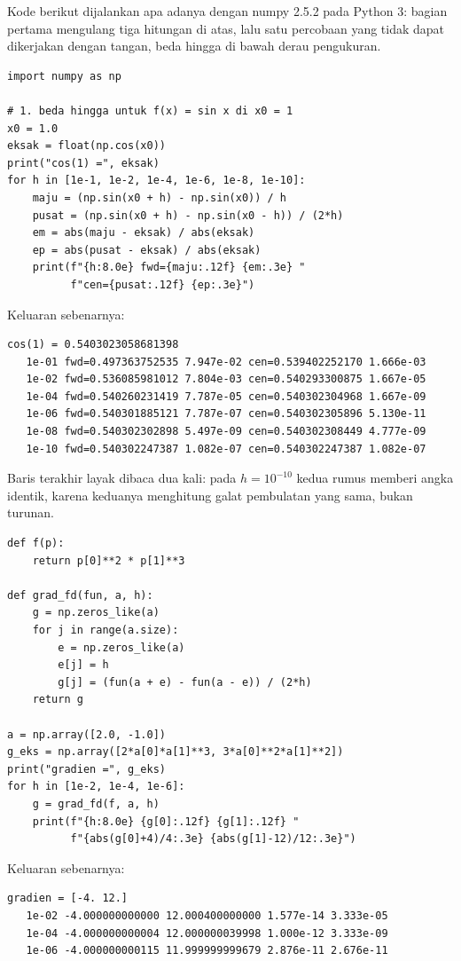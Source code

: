 Kode berikut dijalankan apa adanya dengan numpy 2.5.2 pada Python 3: bagian pertama mengulang
tiga hitungan di atas, lalu satu percobaan yang tidak dapat dikerjakan dengan tangan, beda
hingga di bawah derau pengukuran.

\begin{lab}
\begin{verbatim}
import numpy as np

# 1. beda hingga untuk f(x) = sin x di x0 = 1
x0 = 1.0
eksak = float(np.cos(x0))
print("cos(1) =", eksak)
for h in [1e-1, 1e-2, 1e-4, 1e-6, 1e-8, 1e-10]:
    maju = (np.sin(x0 + h) - np.sin(x0)) / h
    pusat = (np.sin(x0 + h) - np.sin(x0 - h)) / (2*h)
    em = abs(maju - eksak) / abs(eksak)
    ep = abs(pusat - eksak) / abs(eksak)
    print(f"{h:8.0e} fwd={maju:.12f} {em:.3e} "
          f"cen={pusat:.12f} {ep:.3e}")
\end{verbatim}
Keluaran sebenarnya:
\begin{verbatim}
cos(1) = 0.5403023058681398
   1e-01 fwd=0.497363752535 7.947e-02 cen=0.539402252170 1.666e-03
   1e-02 fwd=0.536085981012 7.804e-03 cen=0.540293300875 1.667e-05
   1e-04 fwd=0.540260231419 7.787e-05 cen=0.540302304968 1.667e-09
   1e-06 fwd=0.540301885121 7.787e-07 cen=0.540302305896 5.130e-11
   1e-08 fwd=0.540302302898 5.497e-09 cen=0.540302308449 4.777e-09
   1e-10 fwd=0.540302247387 1.082e-07 cen=0.540302247387 1.082e-07
\end{verbatim}
\end{lab}

Baris terakhir layak dibaca dua kali: pada $h=10^{-10}$ kedua rumus memberi angka identik,
karena keduanya menghitung galat pembulatan yang sama, bukan turunan.

\begin{lab}
\begin{verbatim}
def f(p):
    return p[0]**2 * p[1]**3

def grad_fd(fun, a, h):
    g = np.zeros_like(a)
    for j in range(a.size):
        e = np.zeros_like(a)
        e[j] = h
        g[j] = (fun(a + e) - fun(a - e)) / (2*h)
    return g

a = np.array([2.0, -1.0])
g_eks = np.array([2*a[0]*a[1]**3, 3*a[0]**2*a[1]**2])
print("gradien =", g_eks)
for h in [1e-2, 1e-4, 1e-6]:
    g = grad_fd(f, a, h)
    print(f"{h:8.0e} {g[0]:.12f} {g[1]:.12f} "
          f"{abs(g[0]+4)/4:.3e} {abs(g[1]-12)/12:.3e}")
\end{verbatim}
Keluaran sebenarnya:
\begin{verbatim}
gradien = [-4. 12.]
   1e-02 -4.000000000000 12.000400000000 1.577e-14 3.333e-05
   1e-04 -4.000000000004 12.000000039998 1.000e-12 3.333e-09
   1e-06 -4.000000000115 11.999999999679 2.876e-11 2.676e-11
\end{verbatim}
\end{lab}

